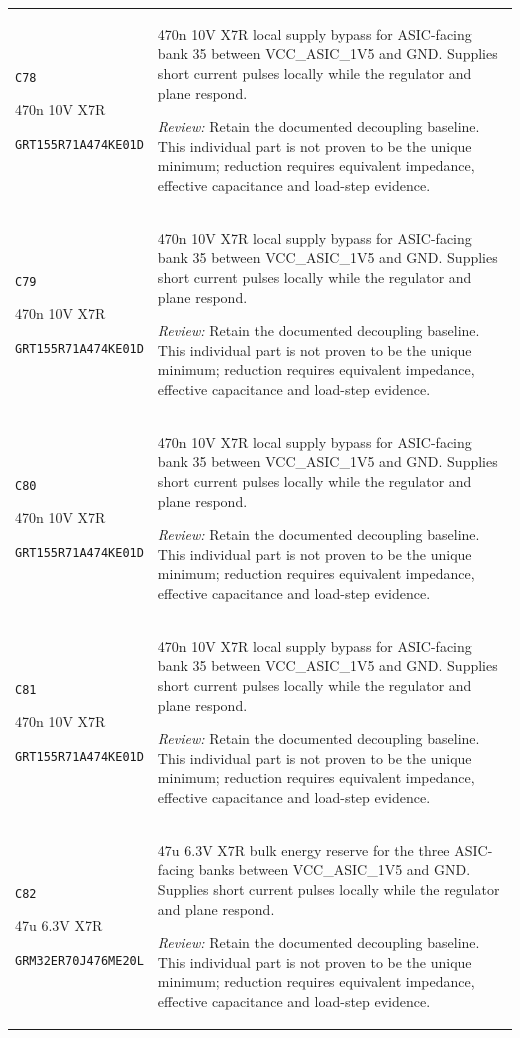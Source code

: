 \documentclass[10pt,a4paper]{article}
\begin{document}
\begin{longtable}{@{}P{46mm}P{117mm}@{}}
\nolinkurl{C78}\par 470n 10V X7R\par\scriptsize \nolinkurl{GRT155R71A474KE01D} & 470n 10V X7R local supply bypass for ASIC-facing bank 35 between VCC\_ASIC\_1V5 and GND. Supplies short current pulses locally while the regulator and plane respond.\par\smallskip\textit{Review:} Retain the documented decoupling baseline. This individual part is not proven to be the unique minimum; reduction requires equivalent impedance, effective capacitance and load-step evidence. \\
\nolinkurl{C79}\par 470n 10V X7R\par\scriptsize \nolinkurl{GRT155R71A474KE01D} & 470n 10V X7R local supply bypass for ASIC-facing bank 35 between VCC\_ASIC\_1V5 and GND. Supplies short current pulses locally while the regulator and plane respond.\par\smallskip\textit{Review:} Retain the documented decoupling baseline. This individual part is not proven to be the unique minimum; reduction requires equivalent impedance, effective capacitance and load-step evidence. \\
\nolinkurl{C80}\par 470n 10V X7R\par\scriptsize \nolinkurl{GRT155R71A474KE01D} & 470n 10V X7R local supply bypass for ASIC-facing bank 35 between VCC\_ASIC\_1V5 and GND. Supplies short current pulses locally while the regulator and plane respond.\par\smallskip\textit{Review:} Retain the documented decoupling baseline. This individual part is not proven to be the unique minimum; reduction requires equivalent impedance, effective capacitance and load-step evidence. \\
\nolinkurl{C81}\par 470n 10V X7R\par\scriptsize \nolinkurl{GRT155R71A474KE01D} & 470n 10V X7R local supply bypass for ASIC-facing bank 35 between VCC\_ASIC\_1V5 and GND. Supplies short current pulses locally while the regulator and plane respond.\par\smallskip\textit{Review:} Retain the documented decoupling baseline. This individual part is not proven to be the unique minimum; reduction requires equivalent impedance, effective capacitance and load-step evidence. \\
\nolinkurl{C82}\par 47u 6.3V X7R\par\scriptsize \nolinkurl{GRM32ER70J476ME20L} & 47u 6.3V X7R bulk energy reserve for the three ASIC-facing banks between VCC\_ASIC\_1V5 and GND. Supplies short current pulses locally while the regulator and plane respond.\par\smallskip\textit{Review:} Retain the documented decoupling baseline. This individual part is not proven to be the unique minimum; reduction requires equivalent impedance, effective capacitance and load-step evidence. \\

\end{longtable}
\end{document}
